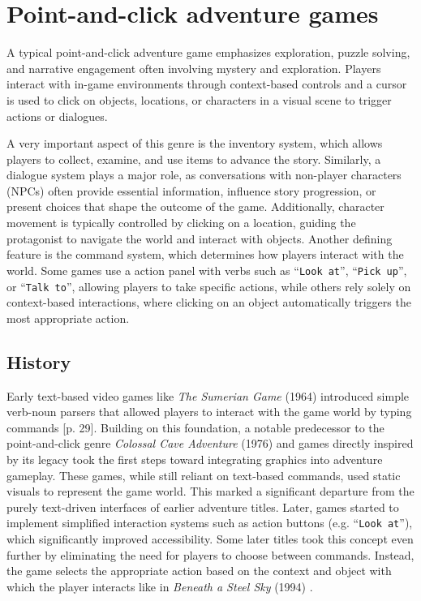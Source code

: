 \section{Point-and-click adventure games}
A typical point-and-click adventure game emphasizes exploration, puzzle solving, and narrative engagement often involving mystery and exploration. Players interact with in-game environments through context-based controls and a cursor is used to click on objects, locations, or characters in a visual scene to trigger actions or dialogues. 

A very important aspect of this genre is the inventory system, which allows players to collect, examine, and use items to advance the story. Similarly, a dialogue system plays a major role, as conversations with non-player characters (NPCs) often provide essential information, influence story progression, or present choices that shape the outcome of the game. Additionally, character movement is typically controlled by clicking on a location, guiding the protagonist to navigate the world and interact with objects. Another defining feature is the command system, which determines how players interact with the world. Some games use a action panel with verbs such as “\texttt{Look at}”, “\texttt{Pick up}”, or “\texttt{Talk to}”, allowing players to take specific actions, while others rely solely on context-based interactions, where clicking on an object automatically triggers the most appropriate action. 

\subsection{History}
Early text-based video games like \textit{The Sumerian Game} (1964) introduced simple verb-noun parsers that allowed players to interact with the game world by typing commands \cite{Salter2014}[p. 29]. Building on this foundation, a notable predecessor to the point-and-click genre \textit{Colossal Cave Adventure} (1976) and games directly inspired by its legacy took the first steps toward integrating graphics into adventure gameplay. These games, while still reliant on text-based commands, used static visuals to represent the game world. This marked a significant departure from the purely text-driven interfaces of earlier adventure titles. Later, games started to implement simplified interaction systems such as action buttons (e.g. “\texttt{Look at}”), which significantly improved accessibility. Some later titles took this concept even further by eliminating the need for players to choose between commands. Instead, the game selects the appropriate action based on the context and object with which the player interacts like in \textit{Beneath a Steel Sky} (1994) \cite{Carton2023history}.

